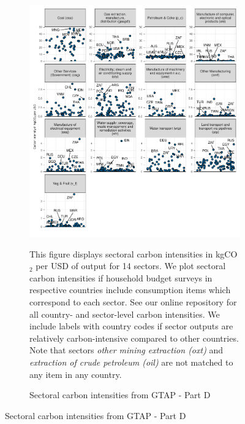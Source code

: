 \begin{figure}[ht!]\ContinuedFloat
\begin{subfigure}[b]{\textwidth}
  \centering
  \includegraphics{Analysis_Carbon_Intensities_GTAP/Figure_2.1.1_D_2017B.pdf}
  \caption{Sectoral carbon intensities from GTAP - Part D} \label{fig:B4}  
  \begin{subcaption2}
    This figure displays sectoral carbon intensities in kgCO$_{2}$ per USD of output for 14 sectors. We plot sectoral carbon intensities if household budget surveys in respective countries include consumption items which correspond to each sector. See our online repository for all country- and sector-level carbon intensities. We include labels with country codes if sector outputs are relatively carbon-intensive compared to other countries. Note that sectors \textit{other mining extraction (oxt)} and \textit{extraction of crude petroleum (oil)} are not matched to any item in any country.
  \end{subcaption2}
\end{subfigure}
\end{figure}

\clearpage